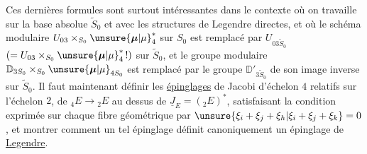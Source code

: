 Ces dernières formules sont surtout
intéressantes dans le contexte où on travaille 
sur la base absolue $\widetilde S_0$ et
avec les structures de Legendre directes,
et où le schéma modulaire $U_{03}\times_{S_0}\unsure{\boldsymbol{\mu}|\mu}_4^*$ sur
$S_0$ est remplacé par $U_{03\widetilde S_0}$
$(=U_{03}\times_{S_0}\unsure{\boldsymbol{\mu}|\mu}_4^*\,!)$
sur $\widetilde S_0$, et le groupe modulaire
$\mathbb{D}_{3S_0}\times_{S_0}\unsure{\boldsymbol{\mu}|\mu}_{4S_0}$ est remplacé par le
groupe $\mathbb{D}'_{3\widetilde S_0}$
de  son image inverse sur $\widetilde S_0$.
Il faut maintenant définir les
\uline{épinglages} de Jacobi d'échelon $4$ relatifs
sur l'échelon $2$, 
de ${}_4E\longrightarrow{}_2E$ au dessus de
$\underline{J}_E=({}_2E)^*$, satisfaisant la condition exprimée
 sur chaque fibre géométrique
par $\unsure{\xi_i+\xi_j+\xi_h|\xi_i+\xi_j+\xi_k}=0$, et montrer comment
un tel épinglage définit canoniquement
un épinglage de \uline{Legendre}.
